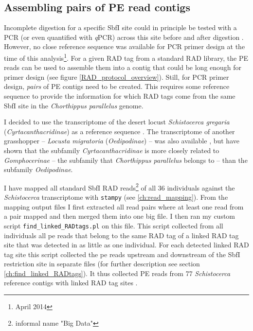 \documentclass[a4paper,12pt,times,authoryear,twoside,print,index]{Classes/PhDThesisPSnPDF}\usepackage[]{graphicx}\usepackage[]{color}
\begin{document}
\FloatBarrier
\subsection{Assembling pairs of PE read contigs}

Incomplete digestion for a specific SbfI site could in principle be tested with a PCR (or even quantified with \textit{q}PCR) across this site before and after digestion \citep{Luca2011}. However, no close reference sequence was available for PCR primer design at the time of this analysis\footnote{April 2014}. For a given \gls{RAD tag} from a standard RAD library, the PE reads can be used to assemble them into a \gls{contig} that could be long enough for primer design (see figure \ref{RAD_protocol_overview}).
Still, for PCR primer design, \emph{pairs} of PE \glspl{contig} need to be created. This requires some reference sequence to provide the information for which \glspl{RAD tag} come from the same SbfI site in the \textit{Chorthippus parallelus} genome.

I decided to use the transcriptome of the desert locust \textit{Schistocerca gregaria} (\textit{Cyrtacanthacridinae}) as a reference sequence \citep{Badisco2011} . The transcriptome of another grasshopper -- \textit{Locusta migratoria} (\textit{Oedipodinae}) -- was also available \citep{Kang2004}, but \cite{Liu2008a} have shown that the subfamily \textit{Cyrtacanthacridinae} is more closely related to \textit{Gomphocerinae} -- the subfamily that \textit{Chorthippus parallelus} belongs to -- than the subfamily \textit{Oedipodinae}.

I have mapped all standard SbfI RAD reads\footnote{informal name "Big Data"} of all 36 individuals against the \textit{Schistocerca} transcriptome with \texttt{stampy} \citep{Lunter2011} (see \vref{ch:read_mapping}). From the mapping output files I first extracted all read pairs where at least one read from a pair mapped and then merged them into one big file. I then ran my custom script \texttt{find\_linked\_RADtags.pl} on this file. This script collected from all individuals all \gls{pe} reads that belong to the same \gls{RAD tag} of a \gls{linked RAD tag site} that was detected in as little as one individual. For each detected \gls{linked RAD tag site} this script collected the \gls{pe} reads upstream and downstream of the SbfI restriction site in separate files (for further description see section \ref{ch:find_linked_RADtags}). It thus collected PE reads from 77 \textit{Schistocerca} reference contigs with \glspl{linked RAD tag site} .
\end{document}
